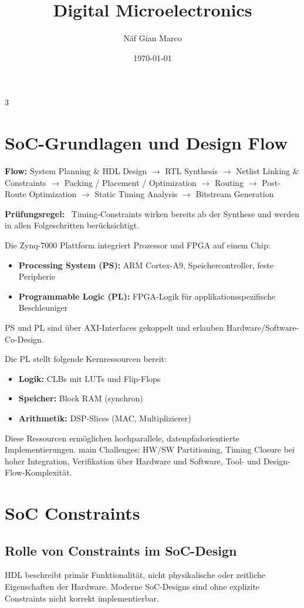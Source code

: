 \documentclass[10pt,a4paper]{article}
\title{Digital Microelectronics}
\author{Näf Gian Marco}
\date{\today}
\newcommand{\prule}[1]{\textbf{\textcolor{examBlue}{Prüfungsregel:}}~#1}
\newcommand{\hilite}[1]{\colorbox{yellow!25}{#1}}
\begin{document}
\begin{multicols}{3}

\section{SoC-Grundlagen und Design Flow}


\textbf{Flow:}  
System Planning \& HDL Design
$\rightarrow$ RTL Synthesis
$\rightarrow$ Netlist Linking \& Constraints
$\rightarrow$ Packing / Placement / Optimization
$\rightarrow$ Routing
$\rightarrow$ Post-Route Optimization
$\rightarrow$ Static Timing Analysis
$\rightarrow$ Bitstream Generation

\prule{%
Timing-Constraints wirken bereits ab der \hilite{Synthese} und werden in allen Folgeschritten berücksichtigt.
}


Die Zynq-7000 Plattform integriert Prozessor und FPGA auf einem Chip:
\begin{itemize}
  \item \textbf{Processing System (PS):} ARM Cortex-A9, Speichercontroller, feste Peripherie
  \item \textbf{Programmable Logic (PL):} FPGA-Logik für applikationsspezifische Beschleuniger
\end{itemize}

PS und PL sind über \hilite{AXI-Interfaces} gekoppelt und erlauben Hardware/Software-Co-Design.


Die PL stellt folgende Kernressourcen bereit:
\begin{itemize}
  \item \textbf{Logik:} CLBs mit LUTs und Flip-Flops
  \item \textbf{Speicher:} Block RAM (synchron)
  \item \textbf{Arithmetik:} DSP-Slices (MAC, Multiplizierer)
\end{itemize}
Diese Ressourcen ermöglichen hochparallele,
\hilite{datenpfadorientierte} Implementierungen.
main Challenges: HW/SW Partitioning, Timing Closure bei hoher Integration, Verifikation über Hardware und Software, Tool- und Design-Flow-Komplexität.


\section{SoC Constraints}

\subsection{Rolle von Constraints im SoC-Design}
HDL beschreibt primär Funktionalität, nicht physikalische oder zeitliche Eigenschaften der Hardware.  
Moderne SoC-Designs sind ohne explizite Constraints nicht korrekt implementierbar.


\end{multicols}
\end{document}
